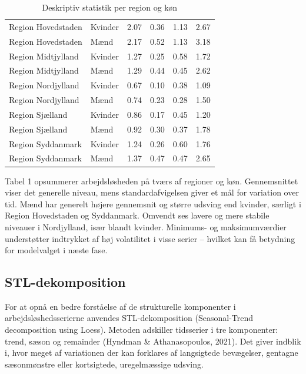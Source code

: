\documentclass[
]{article}
\begin{document}
\begin{longtable}[t]{llrrrr}
\caption{Deskriptiv statistik per region og køn}\\
\toprule
\cellcolor[HTML]{f0f0f0}{\textbf{region}} & \cellcolor[HTML]{f0f0f0}{\textbf{kon}} & \cellcolor[HTML]{f0f0f0}{\textbf{Gennemsnit}} & \cellcolor[HTML]{f0f0f0}{\textbf{Standardafvigelse}} & \cellcolor[HTML]{f0f0f0}{\textbf{Minimum}} & \cellcolor[HTML]{f0f0f0}{\textbf{Maksimum}}\\
\midrule
Region Hovedstaden & Kvinder & 2.07 & 0.36 & 1.13 & 2.67\\
Region Hovedstaden & Mænd & 2.17 & 0.52 & 1.13 & 3.18\\
Region Midtjylland & Kvinder & 1.27 & 0.25 & 0.58 & 1.72\\
Region Midtjylland & Mænd & 1.29 & 0.44 & 0.45 & 2.62\\
Region Nordjylland & Kvinder & 0.67 & 0.10 & 0.38 & 1.09\\
\addlinespace
Region Nordjylland & Mænd & 0.74 & 0.23 & 0.28 & 1.50\\
Region Sjælland & Kvinder & 0.86 & 0.17 & 0.45 & 1.20\\
Region Sjælland & Mænd & 0.92 & 0.30 & 0.37 & 1.78\\
Region Syddanmark & Kvinder & 1.24 & 0.26 & 0.60 & 1.76\\
Region Syddanmark & Mænd & 1.37 & 0.47 & 0.47 & 2.65\\
\bottomrule
\end{longtable}

Tabel 1 opsummerer arbejdsløsheden på tværs af regioner og køn.
Gennemsnittet viser det generelle niveau, mens standardafvigelsen giver
et mål for variation over tid. Mænd har generelt højere gennemsnit og
større udsving end kvinder, særligt i Region Hovedstaden og Syddanmark.
Omvendt ses lavere og mere stabile niveauer i Nordjylland, især blandt
kvinder. Minimums- og maksimumværdier understøtter indtrykket af høj
volatilitet i visse serier -- hvilket kan få betydning for modelvalget i
næste fase.

\subsection{STL-dekomposition}\label{stl-dekomposition}

For at opnå en bedre forståelse af de strukturelle komponenter i
arbejdsløshedsserierne anvendes STL-dekomposition (Seasonal-Trend
decomposition using Loess). Metoden adskiller tidsserier i tre
komponenter: trend, sæson og remainder (Hyndman \& Athanasopoulos,
2021). Det giver indblik i, hvor meget af variationen der kan forklares
af langsigtede bevægelser, gentagne sæsonmønstre eller kortsigtede,
uregelmæssige udsving.
\end{document}
